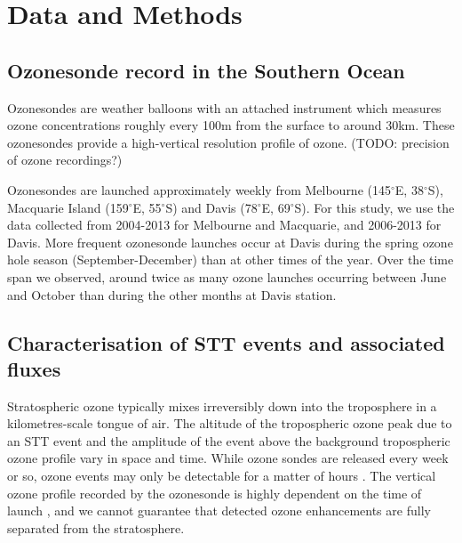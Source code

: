 \documentclass{article}
\begin{document}
\section{Data and Methods}

  \subsection{Ozonesonde record in the Southern Ocean}
    Ozonesondes are weather balloons with an attached instrument which measures ozone concentrations roughly every 100m from the surface to around 30km. These ozonesondes provide a high-vertical resolution profile of ozone. (TODO: precision of ozone recordings?)
    
    Ozonesondes are launched approximately weekly from Melbourne (145$^{\circ}$E, 38$^{\circ}$S), Macquarie Island (159$^{\circ}$E, 55$^{\circ}$S) and Davis (78$^{\circ}$E, 69$^{\circ}$S). 
    For this study, we use the data collected from 2004-2013 for Melbourne and Macquarie, and 2006-2013 for Davis. 
    More frequent ozonesonde launches occur at Davis during the spring ozone hole season (September-December) than at other times of the year.
    Over the time span we observed, around twice as many ozone launches occurring between June and October than during the other months at Davis station.
    

  \subsection{Characterisation of STT events and associated fluxes}
    \label{Section:CharacterisationOfSTTs}
    
    Stratospheric ozone typically mixes irreversibly down into the troposphere in a kilometres-scale tongue of air.
    The altitude of the tropospheric ozone peak due to an STT event and the amplitude of the event above the background tropospheric ozone profile vary in space and time.
    While ozone sondes are released every week or so, ozone events may only be detectable for a matter of hours \citep{Tang2012}.
    The vertical ozone profile recorded by the ozonesonde is highly dependent on the time of launch \citep{Sprenger2003}, and we cannot guarantee that detected ozone enhancements are fully separated from the stratosphere.
    
\end{document}
